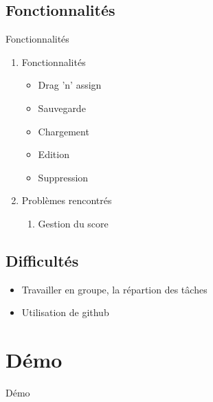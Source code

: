 \documentclass[12pt]{beamer}
\begin{document}
\subsection{Fonctionnalités}
    \begin{frame} {Fonctionnalités}
        \begin{enumerate}
            \item Fonctionnalités
            \begin{itemize}
                \item Drag 'n' assign
                \item Sauvegarde
                \item Chargement
                \item Edition
                \item Suppression
            \end{itemize}    
                        
            \item Problèmes rencontrés
            \begin{enumerate}
                \item Gestion du score 
            \end{enumerate}
        \end{enumerate}
\end{frame}

\subsection{Difficultés}
    \begin{frame}
        \begin{itemize}
          \item Travailler en groupe, la répartion des tâches
          \item Utilisation de github
        \end{itemize}
    \end{frame}

\section{Démo}
    \begin{frame}{Démo}
    \end{frame}
\end{document}

